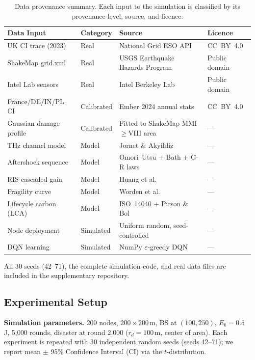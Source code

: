 \documentclass[12pt, onecolumn, journal]{IEEEtran}
\begin{document}
\begin{table}[!t]
\centering
\caption{Data provenance summary. Each input to the simulation is classified by its provenance level, source, and licence.}
\label{tab:data_provenance}
\renewcommand{\arraystretch}{1.12}
\begin{tabular}{p{2.6cm} l p{3.0cm} l}
\toprule
\textbf{Data Input} & \textbf{Category} & \textbf{Source} & \textbf{Licence} \\
\midrule
UK CI trace (2023) & Real & National Grid ESO API~\cite{uk_carbon_api} & CC~BY~4.0 \\
ShakeMap grid.xml & Real & USGS Earthquake Hazards Program~\cite{worden2005shakemap} & Public domain \\
Intel Lab sensors & Real & Intel Berkeley Lab~\cite{intel_lab_data} & Public domain \\
\midrule
France/DE/IN/PL CI & Calibrated & Ember 2024 annual stats~\cite{ember2024} & CC~BY~4.0 \\
Gaussian damage profile & Calibrated & Fitted to ShakeMap MMI${\geq}$VIII area & --- \\
\midrule
THz channel model & Model & Jornet \& Akyildiz~\cite{jornet2011thz} & --- \\
Aftershock sequence & Model & Omori--Utsu + Bath + G-R laws~\cite{utsu1995omori} & --- \\
RIS cascaded gain & Model & Huang et al.~\cite{huang2021ris} & --- \\
Fragility curve & Model & Worden et al.~\cite{worden2005shakemap} & --- \\
Lifecycle carbon (LCA) & Model & ISO~14040 + Pirson \& Bol~\cite{pirson2021embodied} & --- \\
\midrule
Node deployment & Simulated & Uniform random, seed-controlled & --- \\
DQN learning & Simulated & NumPy $\varepsilon$-greedy DQN & --- \\
\bottomrule
\end{tabular}
\end{table}

All 30 seeds (42--71), the complete simulation code, and real data files are included in the supplementary repository.

\subsection{Experimental Setup}
\label{sec:setup}

\textbf{Simulation parameters.}
200 nodes, $200 \times 200$\,m, BS at $(100, 250)$, $E_0 = 0.5$\,J, 5{,}000 rounds, disaster at round 2{,}000 ($r_d = 100$\,m, center of area).
Each experiment is repeated with 30 independent random seeds (seeds 42--71); we report mean $\pm$ 95\% Confidence Interval (CI) via the $t$-distribution.
\end{document}
